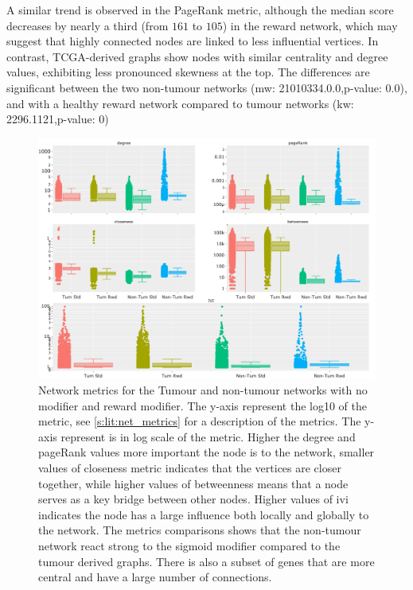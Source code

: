A similar trend is observed in the PageRank metric, although the median score decreases by nearly a third (from $161$ to $105$) in the reward network, which may suggest that highly connected nodes are linked to less influential vertices. In contrast, TCGA-derived graphs show nodes with similar centrality and degree values, exhibiting less pronounced skewness at the top. The differences are significant between the two non-tumour networks (\acrshort{mw}: 21010334.0.0,p-value: 0.0), and with a healthy reward network compared to tumour networks (\acrshort{kw}: 2296.1121,p-value: 0)

\begin{figure}[!htb]    
    \centering
    \includegraphics[width=1.0\textwidth,keepaspectratio]{Sections/Network_II/validation/network_comparison.png}
    \caption[Network metrics for cancerous and healthy graphs]{Network metrics for the Tumour and non-tumour networks with no modifier and reward modifier. The y-axis represent the log10 of the metric, see \cref{s:lit:net_metrics} for a description of the metrics. The y-axis represent is in log scale of the metric. Higher the degree and pageRank values more important the node is to the network, smaller values of closeness metric indicates that the vertices are closer together, while higher values of betweenness means that a node serves as a key bridge between other nodes. Higher values of \acrlong{ivi} indicates the node has a large influence both locally and globally to the network. The metrics comparisons shows that the non-tumour network react strong to the sigmoid modifier compared to the tumour derived graphs. There is also a subset of genes that are more central and have a large number of connections.}
    \label{fig:N_II:net_metrics_comp}
\end{figure}


